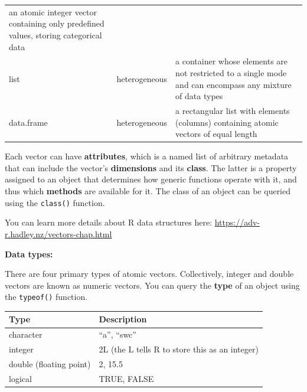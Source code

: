 \documentclass[]{book}
\begin{document}
\begin{longtable}[]{@{}lll@{}}
\begin{minipage}[t]{0.71\columnwidth}
an atomic integer vector containing only predefined values, storing categorical data\strut
\end{minipage}\tabularnewline
\begin{minipage}[t]{0.10\columnwidth}\raggedright
list\strut
\end{minipage} & \begin{minipage}[t]{0.10\columnwidth}\raggedright
heterogeneous\strut
\end{minipage} & \begin{minipage}[t]{0.71\columnwidth}\raggedright
a container whose elements are not restricted to a single mode and can encompass any mixture of data types\strut
\end{minipage}\tabularnewline
\begin{minipage}[t]{0.10\columnwidth}\raggedright
data.frame\strut
\end{minipage} & \begin{minipage}[t]{0.10\columnwidth}\raggedright
heterogeneous\strut
\end{minipage} & \begin{minipage}[t]{0.71\columnwidth}\raggedright
a rectangular list with elements (columns) containing atomic vectors of equal length\strut
\end{minipage}\tabularnewline
\bottomrule
\end{longtable}

Each vector can have \textbf{attributes}, which is a named list of arbitrary metadata that can include the vector's \textbf{dimensions} and its \textbf{class}. The latter is a property assigned to an object that determines how generic functions operate with it, and thus which \textbf{methods} are available for it. The class of an object can be queried using the \texttt{class()} function.

You can learn more details about R data structures here: \url{https://adv-r.hadley.nz/vectors-chap.html}

\textbf{Data types:}

There are four primary types of atomic vectors. Collectively, integer and double vectors are known as numeric vectors. You can query the \textbf{type} of an object using the \texttt{typeof()} function.

\begin{longtable}[]{@{}ll@{}}
\toprule
Type & Description\tabularnewline
\midrule
\endhead
character & ``a'', ``swc''\tabularnewline
integer & 2L (the L tells R to store this as an integer)\tabularnewline
double (floating point) & 2, 15.5\tabularnewline
logical & TRUE, FALSE\tabularnewline
\bottomrule
\end{longtable}
\end{document}

